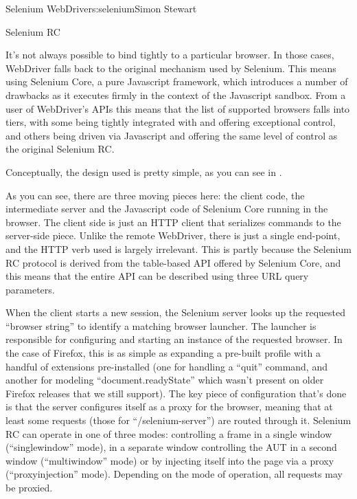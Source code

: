 \begin{aosachapter}{Selenium WebDriver}{s:selenium}{Simon Stewart}
\begin{aosasect1}{Selenium RC}

It's not always possible to bind tightly to a particular browser. In
those cases, WebDriver falls back to the original mechanism used by
Selenium. This means using Selenium Core, a pure Javascript framework,
which introduces a number of drawbacks as it executes firmly in the
context of the Javascript sandbox. From a user of WebDriver's APIs
this means that the list of supported browsers falls into tiers, with
some being tightly integrated with and offering exceptional control,
and others being driven via Javascript and offering the same level of
control as the original Selenium RC.

Conceptually, the design used is pretty simple, as you can see in
.


As you can see, there are three moving pieces here: the client code,
the intermediate server and the Javascript code of Selenium Core
running in the browser. The client side is just an HTTP client that
serializes commands to the server-side piece. Unlike the remote
WebDriver, there is just a single end-point, and the HTTP verb used is
largely irrelevant. This is partly because the Selenium RC protocol is
derived from the table-based API offered by Selenium Core, and this
means that the entire API can be described using three URL query
parameters.

When the client starts a new session, the Selenium server looks up the
requested ``browser string'' to identify a matching browser
launcher. The launcher is responsible for configuring and starting an
instance of the requested browser. In the case of Firefox, this is as
simple as expanding a pre-built profile with a handful of extensions
pre-installed (one for handling a ``quit'' command, and another for
modeling ``document.readyState'' which wasn't present on older
Firefox releases that we still support). The key piece of
configuration that's done is that the server configures itself as a
proxy for the browser, meaning that at least some requests (those for
``/selenium-server'') are routed through it.  Selenium RC can operate
in one of three modes: controlling a frame in a single window
(``singlewindow'' mode), in a separate window controlling the AUT in a
second window (``multiwindow'' mode) or by injecting itself into the
page via a proxy (``proxyinjection'' mode). Depending on the mode of
operation, all requests may be proxied.


\end{aosasect1}
\end{aosachapter}
